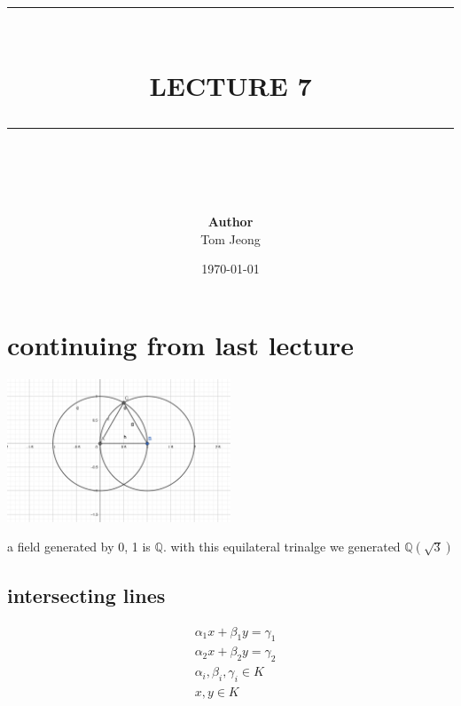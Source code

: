 \documentclass{article}
\newcommand{\HRule}[1]{\rule{\linewidth}{#1}}
\begin{document}

\title{ \normalsize \textsc{}
		\\ [2.0cm]
		\HRule{1.5pt} \\
		\LARGE \textbf{\uppercase{Lecture 7}}
		\HRule{2.0pt} \\ [0.6cm] \LARGE{}
		}

\date{\today}
\author{\textbf{Author} \\ 
		Tom Jeong
        }

\maketitle

\tableofcontents
\newpage

\section{continuing from last lecture}

\begin{center}
    \includegraphics[width=0.5\textwidth]{triangle.png}
\end{center}
a field generated by 0, 1 is $\mathbb{Q}.$ with this equilateral trinalge we generated $\mathbb{Q}(\sqrt{3})$ \\ 
\subsection{intersecting lines }
\begin{align*}
    &\alpha_1 x + \beta_1 y = \gamma_1 \\
    &\alpha_2 x + \beta_2 y = \gamma_2 \\ 
    &\alpha_i, \beta_i, \gamma_i \in K \\ 
    &x, y \in K\\ 
\end{align*}
\end{document}
